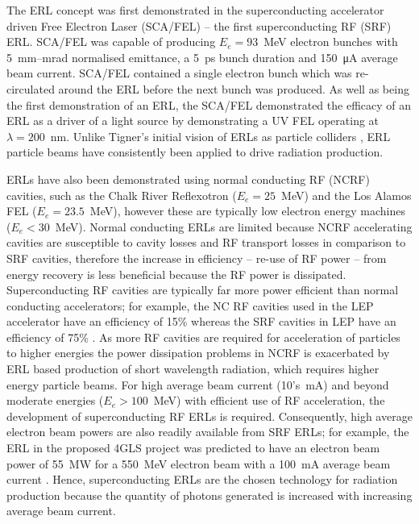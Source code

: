 \documentclass[../main.tex]{subfiles}
\begin{document}
The ERL concept was first demonstrated in the superconducting accelerator driven Free Electron Laser (SCA/FEL) \cite{smith1987development} -- the first superconducting RF (SRF) ERL. SCA/FEL was capable of producing $E_{e} = 93$~\si{\mega\electronvolt} electron bunches with 5~\si{\milli\meter}--\si{\milli\radian} normalised emittance, a 5~\si{\pico\second} bunch duration and 150~\si{\micro\ampere} average beam current. SCA/FEL contained a single electron bunch which was re-circulated around the ERL before the next bunch was produced. As well as being the first demonstration of an ERL, the SCA/FEL demonstrated the efficacy of an ERL as a driver of a light source by demonstrating a UV FEL operating at $\lambda = 200$~\si{\nano\meter}. Unlike Tigner's initial vision of ERLs as particle colliders \cite{tigner1965possible}, ERL particle beams have consistently been applied to drive radiation production.

ERLs have also been demonstrated using normal conducting RF (NCRF) cavities, such as the Chalk River Reflexotron ($E_{e} = 25$~\si{\mega\electronvolt}) \cite{schriber1977experimental} and the Los Alamos FEL ($E_{e} = 23.5$~\si{\mega\electronvolt})\cite{feldman1987energy}, however these are typically low electron energy machines ($E_{e} < 30$~\si{\mega\electronvolt}). Normal conducting ERLs are limited because NCRF accelerating cavities are susceptible to cavity losses and RF transport losses \cite{adolphsen2022european} in comparison to SRF cavities, therefore the increase in efficiency -- re-use of RF power -- from energy recovery is less beneficial because the RF power is dissipated. Superconducting RF cavities are typically far more power efficient than normal conducting accelerators; for example, the NC RF cavities used in the LEP accelerator have an efficiency of 15\% whereas the SRF cavities in LEP have an efficiency of 75\% \cite{weingarten1996superconducting}. As more RF cavities are required for acceleration of particles to higher energies the power dissipation problems in NCRF is exacerbated by ERL based production of short wavelength radiation, which requires higher energy particle beams. For high average beam current (10's~\si{\milli\ampere}) and beyond moderate energies ($E_{e} > 100$~\si{\mega\electronvolt}) with efficient use of RF acceleration, the development of superconducting RF ERLs is required. Consequently, high average electron beam powers are also readily available from SRF ERLs; for example, the ERL in the proposed 4GLS project \cite{poole20034gls} was predicted to have an electron beam power of 55~\si{\mega\watt} for a 550~\si{\mega\electronvolt} electron beam with a 100~\si{\milli\ampere} average beam current \cite{williams2007electron}. Hence, superconducting ERLs are the chosen technology for radiation production because the quantity of photons generated is increased with increasing average beam current. 
\end{document}
